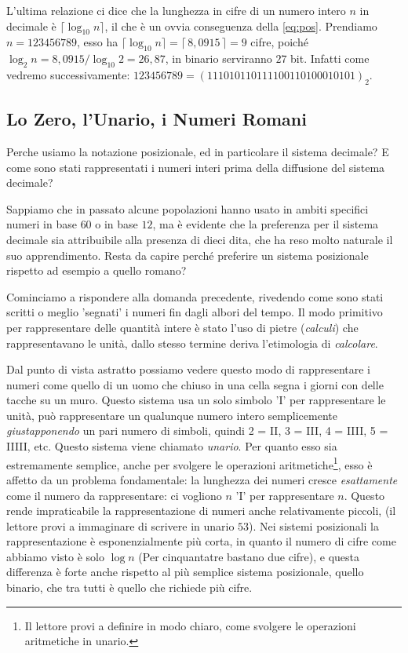 \begin{ex} L'ultima relazione ci dice
che la lunghezza in cifre di un numero intero $n$ in decimale è
$\lceil\log_{10} n \rceil$, il che è un ovvia conseguenza della \eqref{eq:pos}.
Prendiamo $n = 123456789$, esso ha $\lceil \log_{10} n \rceil = \lceil\, 8,0915
\,\rceil = 9$ cifre, poiché $\log_2{n} = 8,0915 / \log_{10}{2} = 26,87$, in
binario serviranno $27$ bit. Infatti come vedremo successivamente: $123456789 =
(111010110111100110100010101)_2$. \end{ex}


\subsection*{Lo Zero, l'Unario, i Numeri Romani}
{ \small
Perche usiamo la notazione posizionale, ed in particolare il sistema decimale?
E come sono stati rappresentati i numeri interi prima della diffusione del
sistema decimale?

Sappiamo che in passato alcune popolazioni hanno usato in ambiti specifici
numeri in base $60$ o in base $12$, ma è evidente che la preferenza per il
sistema decimale sia attribuibile alla presenza di dieci dita, che ha reso
molto naturale il suo apprendimento. Resta da capire perché preferire un
sistema posizionale rispetto ad esempio a quello romano?

Cominciamo a rispondere alla domanda precedente, rivedendo come sono stati
scritti o meglio 'segnati' i numeri fin dagli albori del tempo. Il modo
primitivo per rappresentare delle quantità intere è stato l'uso di pietre
(\emph{calculi}) che rappresentavano le unità, dallo stesso termine deriva
l'etimologia di \emph{calcolare}.

Dal punto di vista astratto possiamo vedere questo modo di rappresentare i
numeri come quello di un uomo che chiuso in una cella segna i giorni con delle
tacche su un muro. Questo sistema usa un solo simbolo '\textsc{I}' per
rappresentare le unità, può rappresentare un qualunque numero intero
semplicemente \emph{giustapponendo} un pari numero di simboli, quindi 2 =
\textsc{II}, 3 = \textsc{III}, 4 = \textsc{IIII}, 5 = \textsc{IIIII}, etc.
Questo sistema viene chiamato \emph{unario}. Per quanto
esso sia estremamente semplice, anche per svolgere le operazioni
aritmetiche\footnote{Il lettore provi a definire in modo chiaro, come svolgere
le operazioni aritmetiche in unario.}, esso è affetto da un problema
fondamentale: la lunghezza dei numeri cresce \emph{esattamente} come il numero
da rappresentare: ci vogliono $n$ 'I' per rappresentare $n$. Questo rende
impraticabile la rappresentazione di numeri anche relativamente piccoli, (il
lettore provi a immaginare di scrivere in unario $53$). Nei sistemi posizionali
la rappresentazione è esponenzialmente più corta, in quanto il numero di cifre
come abbiamo visto è solo $\log n$ (Per cinquantatre bastano due cifre), e
questa differenza è forte anche rispetto al più semplice sistema posizionale,
quello binario, che tra tutti è quello che richiede più cifre.

}
